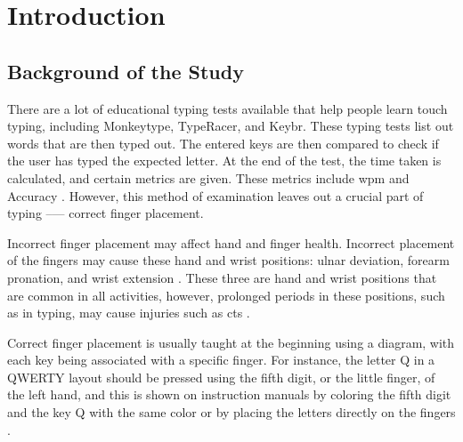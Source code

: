 \documentclass{report}
\begin{document}
\newpage

\printacronyms{}
\newpage

\listoftables
\newpage

\listoffigures
\newpage

\listofequations

\newpage

\tableofcontents
\newpage


\chapter{Introduction}


\section{Background of the Study}
There are a lot of educational typing tests available that help people learn
touch typing, including Monkeytype, TypeRacer, and Keybr. These typing tests
list out words that are then typed out. The entered keys are then compared to
check if the user has typed the expected letter. At the end of the test, the
time taken is calculated, and certain metrics are given. These metrics include
\ac{wpm} and Accuracy \parencite{arif2009}. However, this method of examination
leaves out a crucial part of typing --— correct finger placement.

Incorrect finger placement may affect hand and finger health. Incorrect
placement of the fingers may cause these hand and wrist positions: ulnar
deviation, forearm pronation, and wrist extension \parencite{serina1999}. These
three are hand and wrist positions that are common in all activities, however,
prolonged periods in these positions, such as in typing, may cause injuries such
as \ac{cts} \parencite{toosi2015}.

Correct finger placement is usually taught at the beginning using a diagram,
with each key being associated with a specific finger. For instance, the letter
Q in a QWERTY layout should be pressed using the fifth digit, or the little
finger, of the left hand, and this is shown on instruction manuals by coloring
the fifth digit and the key Q with the same color or by placing the letters
directly on the fingers \parencite{dobson2009touch}.
\end{document}
